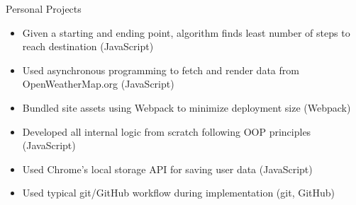 \documentclass{resume} %
\begin{document}
\begin{workSection}{Personal Projects}
    \customItem[
        title=Chess Knight Path Finder,
        duration=Spring 2023,
        keyHighlight=Used DFS graph traversal to find the most optimal path for chess knight.
    ]
    \begin{itemize}
        \vspace{-0.5em}
        \itemsep -6pt {}
        \item Given a starting and ending point, algorithm finds least number of steps to reach destination (JavaScript)
    \end{itemize}
    \customItem[
        title=Weather Webapp,
        duration=Spring 2023,
        keyHighlight=Used variety of web APIs to develop weather forecast webapp with dynamic UI elements
    ]
    \begin{itemize}
        \vspace{-0.5em}
        \itemsep -6pt {}
        \item Used asynchronous programming to fetch and render data from OpenWeatherMap.org (JavaScript)
        \item Bundled site assets using Webpack to minimize deployment size (Webpack)
    \end{itemize}
    \customItem[
        title=To Do List Webapp,
        duration=Fall 2022,
        keyHighlight=Developed interactive to-do list webapp with local save function through vanilla JS
    ]
    \begin{itemize}
        \vspace{-0.5em}
        \itemsep -6pt {}
        \item Developed all internal logic from scratch following OOP principles (JavaScript)
        \item Used Chrome's local storage API for saving user data (JavaScript)
        \item Used typical git/GitHub workflow during implementation (git, GitHub)
    \end{itemize}
\end{workSection}
\end{document}
